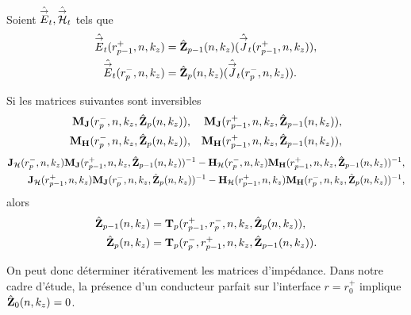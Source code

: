     \begin{prop}%
      \label{prop:cylindre:synthese:impedance}
      Soient \(\hat{{\overset{\rightarrow}{E}}}_t,\hat{{\overset{\rightarrow}{\mathcal{H}}}}_t\) tels que 
      \begin{align*}
      \hat{{\overset{\rightarrow}{E}}}_t(r_{p-1}^+,n,k_z) &= \hat{\mathbf{Z}}_{p-1}(n,k_z)(\hat{{\overset{\rightarrow}{J}}}_t(r_{p-1}^+,n,k_z)),
      \\
      \hat{{\overset{\rightarrow}{E}}}_t(r_{p}^-,n,k_z) &= \hat{\mathbf{Z}}_{p}(n,k_z)(\hat{{\overset{\rightarrow}{J}}}_t(r_{p}^-,n,k_z)).
      \end{align*}

      Si les matrices suivantes sont inversibles
      \begin{align*}
        \mathbf{M}_{\mathbf{J}}(r_p^-,n,k_z,\hat{\mathbf{Z}}_{p}(n,k_z)), && \mathbf{M}_{\mathbf{J}}(r_{p-1}^+,n,k_z,\hat{\mathbf{Z}}_{p-1}(n,k_z)),
        \\
        \mathbf{M}_{\mathbf{H}}(r_p^-,n,k_z,\hat{\mathbf{Z}}_{p}(n,k_z)), && \mathbf{M}_{\mathbf{H}}(r_{p-1}^+,n,k_z,\hat{\mathbf{Z}}_{p-1}(n,k_z)),
      \end{align*}
      \begin{align*}
        \mathbf{J}_{\mathcal{H}}(r_{p}^-,n,k_z)\mathbf{M}_{\mathbf{J}}(r_{p-1}^+,n,k_z,\hat{\mathbf{Z}}_{p-1}(n,k_z))^{-1} - \mathbf{H}_{\mathcal{H}}(r_{p}^-,n,k_z)\mathbf{M}_{\mathbf{H}}(r_{p-1}^+,n,k_z,\hat{\mathbf{Z}}_{p-1}(n,k_z))^{-1},
        \\
        \mathbf{J}_{\mathcal{H}}(r_{p-1}^+,n,k_z)\mathbf{M}_{\mathbf{J}}(r_{p}^-,n,k_z,\hat{\mathbf{Z}}_{p}(n,k_z))^{-1} - \mathbf{H}_{\mathcal{H}}(r_{p-1}^+,n,k_z)\mathbf{M}_{\mathbf{H}}(r_{p}^-,n,k_z,\hat{\mathbf{Z}}_{p}(n,k_z))^{-1},
      \end{align*}
      alors 
      \begin{align*}
        \hat{\mathbf{Z}}_{p-1}(n,k_z) &= \mathbf{T}_p(r_{p-1}^+,r_{p}^-,n,k_z,\hat{\mathbf{Z}}_{p}(n,k_z)),
        \\
        \hat{\mathbf{Z}}_{p}(n,k_z) &= \mathbf{T}_p(r_{p}^-,r_{p-1}^+,n,k_z,\hat{\mathbf{Z}}_{p-1}(n,k_z)).
      \end{align*}

    \end{prop}

    On peut donc déterminer itérativement les matrices d'impédance. Dans notre cadre d'étude, la présence d'un conducteur parfait sur l'interface \(r=r_0^+\) implique \(\hat{\mathbf{Z}}_{0}(n,k_z) = 0\).



